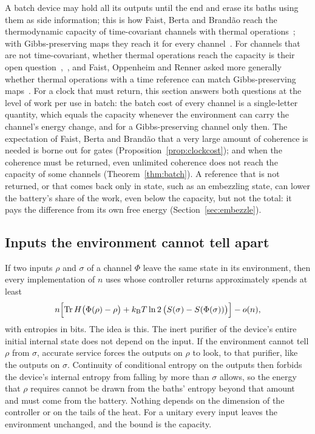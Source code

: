 \documentclass[11pt]{article}
\theoremstyle{definition}
\theoremstyle{remark}
\newcommand{\Tr}{\operatorname{Tr}}
\newcommand{\kB}{k_{\mathrm B}}
\begin{document}
A batch device may hold all its outputs until the end and erase its baths using them as side information; this is how Faist, Berta and Brand\~ao reach the thermodynamic capacity of time-covariant channels with thermal operations~\cite[Sec.~7]{FBB21}; with Gibbs-preserving maps they reach it for every channel~\cite[Sec.~6]{FBB21}. For channels that are not time-covariant, whether thermal operations reach the capacity is their open question~\cite{FBB19},~\cite[Sec.~9]{FBB21}, and Faist, Oppenheim and Renner asked more generally whether thermal operations with a time reference can match Gibbs-preserving maps~\cite{FOR15}. For a clock that must return, this section answers both questions at the level of work per use in batch: the batch cost of every channel is a single-letter quantity, which equals the capacity whenever the environment can carry the channel's energy change, and for a Gibbs-preserving channel only then. The expectation of Faist, Berta and Brand\~ao that a very large amount of coherence is needed is borne out for gates (Proposition~\ref{prop:clockcost}); and when the coherence must be returned, even unlimited coherence does not reach the capacity of some channels (Theorem~\ref{thm:batch}). A reference that is not returned, or that comes back only in state, such as an embezzling state, can lower the battery's share of the work, even below the capacity, but not the total: it pays the difference from its own free energy (Section~\ref{sec:embezzle}).

\subsection{Inputs the environment cannot tell apart}

If two inputs $\rho$ and $\sigma$ of a channel $\Phi$ leave the same state in its environment, then every implementation of $n$ uses whose controller returns approximately spends at least
\[
n\Bigl[\Tr H\bigl(\Phi(\rho)-\rho\bigr)+\kB T\ln2\,\bigl(S(\sigma)-S(\Phi(\sigma))\bigr)\Bigr]-o(n),
\]
with entropies in bits. The idea is this. The inert purifier of the device's entire initial internal state does not depend on the input. If the environment cannot tell $\rho$ from $\sigma$, accurate service forces the outputs on $\rho$ to look, to that purifier, like the outputs on $\sigma$. Continuity of conditional entropy on the outputs then forbids the device's internal entropy from falling by more than $\sigma$ allows, so the energy that $\rho$ requires cannot be drawn from the baths' entropy beyond that amount and must come from the battery. Nothing depends on the dimension of the controller or on the tails of the heat. For a unitary every input leaves the environment unchanged, and the bound is the capacity.
\end{document}
